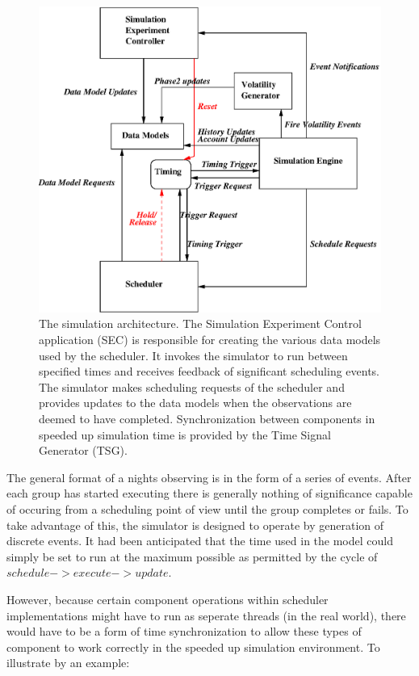 \begin{figure}[htbp]  
  \begin{center}
    \includegraphics[scale=0.8, angle=0]{figures/sim_framework_arch.eps}
  \end{center}
  \caption[The simulation architecture.]
   {The simulation architecture. The Simulation Experiment Control application (SEC) is responsible for creating the various data models used by the scheduler. It invokes the simulator to run between specified times and receives feedback of significant scheduling events. The simulator makes scheduling requests of the scheduler and provides updates to the data models when the observations are deemed to have completed. Synchronization between components in speeded up simulation time is provided by the Time Signal Generator (TSG).}
  \label{fig:sim_frame_arch}
\end{figure}

The general format of a nights observing is in the form of a series of events. After each group has started executing there is generally nothing of significance capable of occuring from a scheduling point of view until the group completes or fails. To take advantage of this, the simulator is designed to operate by generation of discrete events. It had been anticipated that the time used in the model could simply be set to run at the maximum possible as permitted by the cycle of $schedule -> execute -> update$.

 However, because certain component operations within scheduler implementations might have to run as seperate threads (in the real world), there would have to be a form of time synchronization to allow these types of component to work correctly in the speeded up simulation environment. To illustrate by an example:

